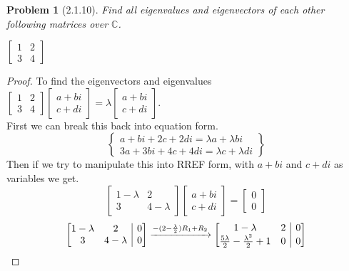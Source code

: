 \documentclass[12pt]{article}   %
\makeatletter
\newcommand{\C}{\mathbb{C}} %
\newtheorem{problem}{Problem}
\newenvironment{amatrix}[1]{%
  \left[\begin{array}{@{}*{#1}{c}|c@{}}
}{%
  \end{array}\right]
}
\makeatother
\begin{document}
\begin{problem}[2.1.10]
Find all eigenvalues and eigenvectors of each other following matrices over $\C$.\\
\begin{center}
$\begin{bmatrix}
    1 & 2\\ 3 & 4
\end{bmatrix}$
\end{center}
\end{problem}
\begin{proof}
    \item To find the eigenvectors and eigenvalues $\begin{bmatrix}
    1 & 2\\ 3 & 4
    \end{bmatrix}\begin{bmatrix}
    a+bi\\
    c+di
    \end{bmatrix}=\lambda\begin{bmatrix}
    a+bi\\c+di
    \end{bmatrix}$.\\
    First we can break this back into equation form.
    \[\left \{ \begin{array}{c}
    a + bi + 2c + 2di = \lambda a + \lambda bi \\
    3a + 3bi + 4c + 4di = \lambda c + \lambda di \end{array} \right \}\]
    Then if we try to manipulate this into RREF form, with $a+bi$ and $c+di$ as variables we get.
    \[\begin{bmatrix}
    1 - \lambda & 2 \\ 3 & 4-\lambda
    \end{bmatrix}\begin{bmatrix}
    a + bi\\c+di
    \end{bmatrix}=\begin{bmatrix}
    0 \\ 0
    \end{bmatrix}\]
    \[\begin{amatrix}{2}
    1 - \lambda & 2 & 0\\ 3 & 4-\lambda & 0
    \end{amatrix}\xrightarrow{-(2-\frac{\lambda}{2})R_1+R_2}\begin{amatrix}{2}
    1-\lambda & 2 & 0\\ \frac{5\lambda}{2}-\frac{\lambda^2}{2}+1 & 0 & 0

\end{amatrix}\]
\end{proof}
\end{document}
